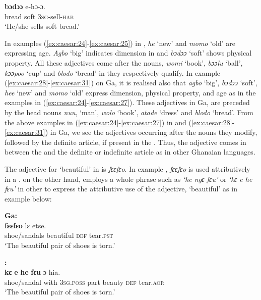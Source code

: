 \documentclass[output=paper,
modfonts
]{langscibook}
\begin{document}
\ea\label{ex:caesar:31}
 \textbf{{bɔdɔɔ}} {e-hɔ-ɔ.}\\
 bread soft 3\textsc{sg}-sell-\textsc{hab} \\
\glt  ‘He/she sells soft bread.’
\z

In examples (\ref{ex:caesar:24}-\ref{ex:caesar:25}) in , \textit{he} ‘new’ and \textit{momo} ‘old’ are expressing age. \textit{Agbo} ‘big’ indicates dimension in  and \textit{bɔdɔɔ} ‘soft’ shows physical property. All these adjectives come after the nouns, \textit{womi} ‘book’, \textit{bɔɔlu} ‘ball’, \textit{kɔɔpoo} ‘cup’ and \textit{blodo} ‘bread’ in  they respectively qualify. In example (\ref{ex:caesar:28}-\ref{ex:caesar:31}) on Ga, it is realised also that \textit{agbo} ‘big’, \textit{bɔdɔɔ} ‘soft’, \textit{hee} ‘new’ and \textit{momo} ‘old’ express dimension, physical property, and age as in the  examples in (\ref{ex:caesar:24}-\ref{ex:caesar:27}). These adjectives in Ga, are preceded by the head nouns \textit{nuu}, ‘man’, \textit{wolo} ‘book’, \textit{atade} ‘dress’ and \textit{blodo} ‘bread’. From the above examples in (\ref{ex:caesar:24}-\ref{ex:caesar:27}) in  and (\ref{ex:caesar:28}-\ref{ex:caesar:31}) in Ga, we see the adjectives occurring after the nouns they modify, followed by the definite article, if present in the . Thus, the adjective comes in between the  and the definite or indefinite article as in other Ghanaian languages. 

The adjective for ‘beautiful’ in  is \textit{fɛɛfɛo}. In example , \textit{fɛɛfɛo} is used attributively in a .  on the other hand, employs a whole phrase such as \textit{‘he ngɛ fɛu’} or \textit{‘kɛ e he fɛu’} in other to express the attributive use of the adjective, ‘beautiful’ as in example  below:


\ea\label{ex:caesar:32}
\textbf{Ga:}\\
 \textbf{{f}}\textbf{{ɛɛ}}\textbf{{f}}\textbf{{ɛ}}\textbf{{o}} {l}{ɛ} {etse.} \\
shoe/sandals beautiful \textsc{def} tear.\textsc{pst}\\
\glt ‘The beautiful pair of shoes is torn.’
\z

\ea\label{ex:caesar:33}
\textbf{:}\\
 \textbf{{kɛ}} \textbf{{e}} \textbf{{he}} \textbf{{fɛu}}  {ɔ} {hia.}\\
shoe/sandal with 3\textsc{sg}.\textsc{poss} part beauty \textsc{def} tear.\textsc{aor}\\
\glt ‘The beautiful pair of shoes is torn.’
\z
\end{document}
